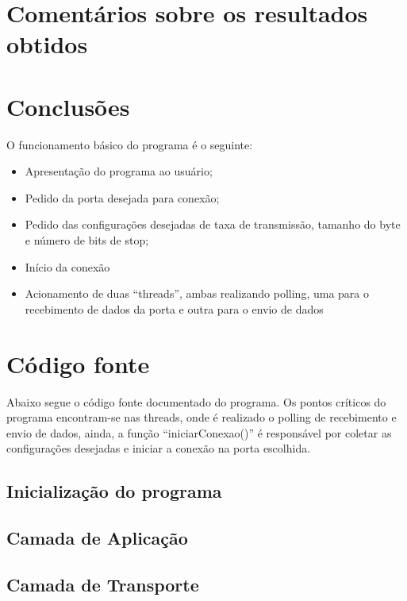 \documentclass[brazil,times,12pt]{abnt}
\begin{document}
\section*{Comentários sobre os resultados obtidos}

\section*{Conclusões}

	
	O funcionamento básico do programa é o seguinte: 
	\begin{itemize}
  		\item Apresentação do programa ao usuário;
  		\item Pedido da porta desejada para conexão;
  		\item Pedido das configurações desejadas de taxa de transmissão, tamanho do
  		byte e número de bits de stop;
  		\item Início da conexão
  		\item Acionamento de duas ``threads'', ambas realizando polling, uma para o
  		recebimento de dados da porta e outra para o envio de dados
	\end{itemize}

\section*{Código fonte}
	Abaixo segue o código fonte documentado do programa. Os pontos críticos do
	programa encontram-se nas threads, onde é realizado o polling de recebimento e
	envio de dados, ainda, a função ``iniciarConexao()'' é responsável por coletar
	as configurações desejadas e iniciar a conexão na porta escolhida.
	
	\subsection*{Inicialização do programa}
	
	
	\subsection*{Camada de Aplicação}
	
	
	\subsection*{Camada de Transporte}
	
	
\end{document}
